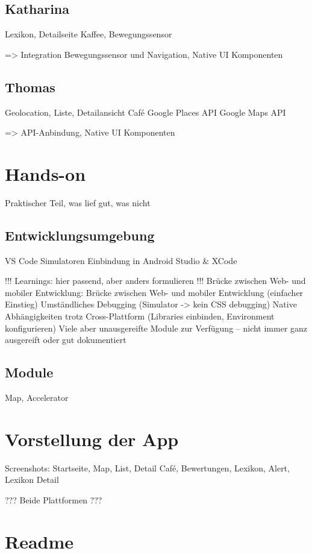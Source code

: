\subsection{Katharina}
Lexikon, Detailseite Kaffee, Bewegungssensor

=> Integration Bewegungssensor und Navigation, Native UI Komponenten

\subsection{Thomas}
Geolocation, Liste, Detailansicht Café
Google Places API
Google Maps API

=> API-Anbindung, Native UI Komponenten



\section{Hands-on}
Praktischer Teil, was lief gut, was nicht

\subsection{Entwicklungsumgebung}
VS Code
Simulatoren
Einbindung in Android Studio \& XCode



!!! Learnings: hier passend, aber anders formulieren !!!
Brücke zwischen Web- und mobiler Entwicklung: Brücke zwischen Web- und mobiler Entwicklung (einfacher Einstieg)
Umständliches Debugging (Simulator -> kein CSS debugging)
Native Abhängigkeiten trotz Cross-Plattform (Libraries einbinden, Environment konfigurieren)
Viele aber unausgereifte Module zur Verfügung – nicht immer ganz ausgereift oder gut dokumentiert


\subsection{Module}
Map, Accelerator



\section{Vorstellung der App}
Screenshots: Startseite, Map, List, Detail Café, Bewertungen, Lexikon, Alert, Lexikon Detail

??? Beide Plattformen ???


\section{Readme}






